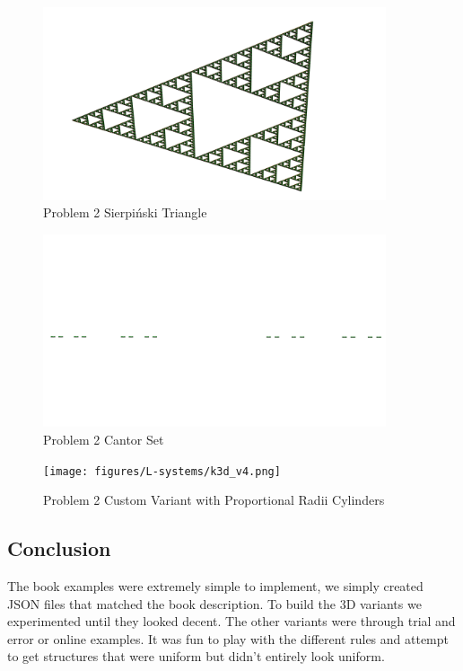 \begin{figure}[H]
    \centering
    \includegraphics[width=0.90\textwidth]{figures/L-systems/sierpinski.png}
    \caption{Problem 2 Sierpiński Triangle}\label{fig:sierpinski}
\end{figure}

\begin{figure}[H]
    \centering
    \includegraphics[width=0.90\textwidth]{figures/L-systems/cantor.png}
    \caption{Problem 2 Cantor Set}\label{fig:cantor}
\end{figure}

\begin{figure}[H]
    \centering
    \texttt{[image: figures/L-systems/k3d\_v4.png]}
    \caption{Problem 2 Custom Variant with Proportional Radii Cylinders}\label{fig:k3d_v4}
\end{figure}

\subsection{Conclusion}
The book examples were extremely simple to implement, we simply
created JSON files that matched the book description. To build the 3D
variants we experimented until they looked decent. The other variants were
through trial and error or online examples. It was fun to play with the
different rules and attempt to get structures that were uniform but didn't
entirely look uniform.
